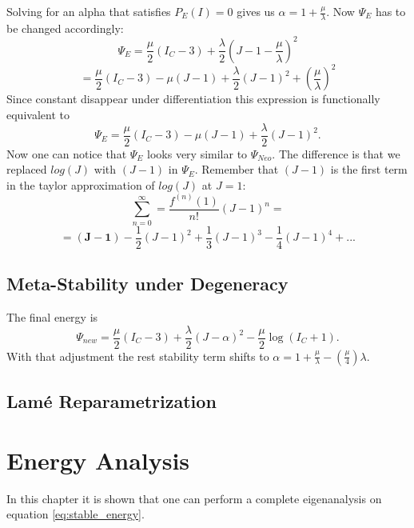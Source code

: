 Solving for an alpha that satisfies $P_{E}(I)=0$ gives us $\alpha=1+\frac{\mu}{\lambda}$. Now $\Psi_{E}$ has to be changed accordingly:
\[
\Psi_{E} = \frac{\mu}{2}\left(I_{C}-3\right) +\frac{\lambda}{2}(J-1-\frac{\mu}{\lambda})^{2}
\]
\[
= \frac{\mu}{2}\left(I_{C}-3\right) - \mu\left(J-1\right) + \frac{\lambda}{2}(J-1)^{2} + \left(\frac{\mu}{\lambda}\right)^{2}
\]
Since constant disappear under differentiation this expression is functionally equivalent to 
\[
\Psi_{E} = \frac{\mu}{2}\left(I_{C}-3\right) - \mu\left(J-1\right) + \frac{\lambda}{2}(J-1)^{2}.
\]
Now one can notice that $\Psi_{E}$ looks very similar to $\Psi_{Neo}$. The difference is that we replaced $log(J)$ with $(J-1)$ in $\Psi_{E}$. Remember that $(J-1)$ is the first term in the taylor approximation of $log(J)$ at $J=1$:
\[
\sum_{n=0}^{\infty} = \frac{f^{(n)}(1)}{n!} (J-1)^{n} =
\]
\[
= \boldsymbol{(J-1)} - \frac{1}{2} (J-1)^{2} + \frac{1}{3} (J-1)^{3} -\frac{1}{4} (J-1)^{4} + ...
\]


\subsection{Meta-Stability under Degeneracy}
The final energy is
\begin{equation}\label{eq:stable_energy}
\Psi_{new} = \frac{\mu}{2}\left(I_{C}-3\right) + \frac{\lambda}{2}(J-\alpha)^{2} - \frac{\mu}{2} \operatorname{log}\left(I_{C}+1\right).
\end{equation}
With that adjustment the rest stability term shifts to $\alpha=1+\frac{\mu}{\lambda}-\left(\frac{\mu}{4}\right)\lambda$.


\subsection{Lamé Reparametrization}


\section{Energy Analysis}
In this chapter it is shown that one can perform a complete eigenanalysis on equation \ref{eq:stable_energy}.


